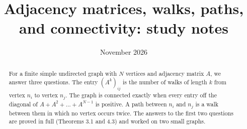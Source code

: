 \documentclass[11pt,a4paper]{article}
\title{Adjacency matrices, walks, paths, and connectivity: study notes}
\author{}
\date{November 2026}
\theoremstyle{definition}
\theoremstyle{plain}
\theoremstyle{remark}
\theoremstyle{plain}
\begin{document}
\maketitle

\begin{abstract}
For a finite simple undirected graph with $N$ vertices and adjacency matrix $A$, we answer three questions. The entry $(A^k)_{ij}$ is the number of walks of length $k$ from vertex $n_i$ to vertex $n_j$. The graph is connected exactly when every entry off the diagonal of $A + A^2 + \dots + A^{N-1}$ is positive. A path between $n_i$ and $n_j$ is a walk between them in which no vertex occurs twice. The answers to the first two questions are proved in full (Theorems 3.1 and 4.3) and worked on two small graphs.
\end{abstract}









\printbibliography
\end{document}
